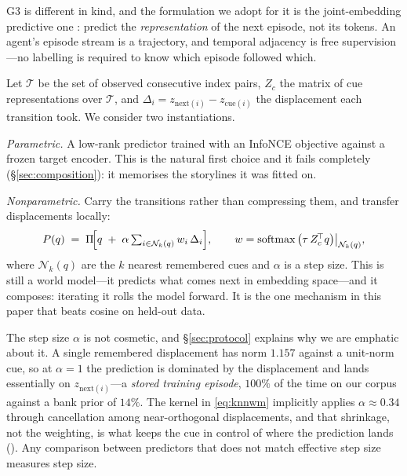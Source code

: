 G3 is different in kind, and the formulation we adopt for it is the joint-embedding
predictive one \citep{lecun2022path,assran2023ijepa}: predict the \emph{representation} of
the next episode, not its tokens. An agent's episode stream is a trajectory, and temporal
adjacency is free supervision---no labelling is required to know which episode followed
which.

Let $\mathcal{T}$ be the set of observed consecutive index pairs, $Z_c$ the matrix of cue
representations over $\mathcal{T}$, and $\Delta_i = z_{\text{next}(i)} - z_{\text{cue}(i)}$
the displacement each transition took. We consider two instantiations.

\emph{Parametric.} A low-rank predictor trained with an InfoNCE objective against a frozen
target encoder. This is the natural first choice and it fails completely
(\S\ref{sec:composition}): it memorises the storylines it was fitted on.

\emph{Nonparametric.} Carry the transitions rather than compressing them, and transfer
displacements locally:
\begin{equation}
P(q) \;=\; \Pi\!\Big[q \;+\; \alpha \textstyle\sum_{i \in \mathcal{N}_k(q)} w_i\, \Delta_i\Big],
\qquad w = \operatorname{softmax}\big(\tau\, Z_c^{\!\top} q\big)\big|_{\mathcal{N}_k(q)} ,
\label{eq:knnwm}
\end{equation}
where $\mathcal{N}_k(q)$ are the $k$ nearest remembered cues and $\alpha$ is a step size.
This is still a world model---it predicts what comes next in embedding space---and it
composes: iterating it rolls the model forward. It is the one mechanism in this paper that
beats cosine on held-out data.

The step size $\alpha$ is not cosmetic, and \S\ref{sec:protocol} explains why we are
emphatic about it. A single remembered displacement has norm $1.157$ against a unit-norm
cue, so at $\alpha{=}1$ the prediction is dominated by the displacement and lands
essentially on $z_{\text{next}(i)}$---a \emph{stored training episode}, $100\%$ of the time
on our corpus against a bank prior of $14\%$. The kernel in \eqref{eq:knnwm} implicitly
applies $\alpha \approx 0.34$ through cancellation among near-orthogonal displacements, and
that shrinkage, not the weighting, is what keeps the cue in control of where the prediction
lands (). Any comparison between predictors that does not match effective step
size measures step size.
